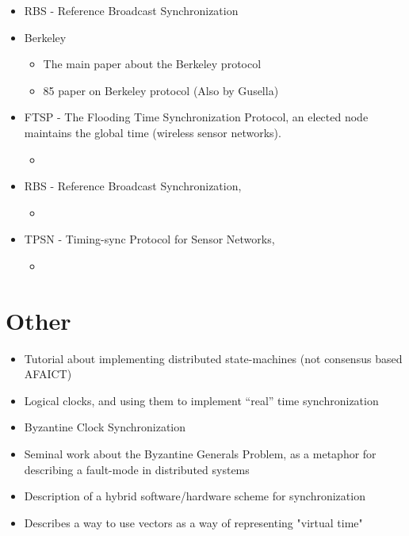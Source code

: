 \documentclass[a4paper,12pt]{article}
\begin{document}
\begin{itemize}
\item \cite{ElsonGirodEstrin02} RBS - Reference Broadcast Synchronization
\item Berkeley
  \begin{itemize}
  \item \cite{Gusella89} The main paper about the Berkeley protocol
  \item \cite{GusellaZatti85} 85 paper on Berkeley protocol (Also by Gusella)
  \end{itemize}
\item FTSP - The Flooding Time Synchronization Protocol, an elected node maintains the global time (wireless sensor networks).
    \begin{itemize}
        \item \cite{Maroti04} 
    \end{itemize}
\item RBS - Reference Broadcast Synchronization, 
    \begin{itemize}
        \item \cite{Elson02}
    \end{itemize}
\item TPSN - Timing-sync Protocol for Sensor Networks,
    \begin{itemize}
        \item 
    \end{itemize}
\end{itemize}



\section{Other}

\begin{itemize}
\item \cite{Schneider90} Tutorial about implementing distributed state-machines (not consensus based AFAICT)
\item \cite{Lamport78} Logical clocks, and using them to implement ``real'' time synchronization
\item \cite{LamportEtAl84} Byzantine Clock Synchronization
\item \cite{Lamport82} Seminal work about the Byzantine Generals Problem, as a metaphor for describing a fault-mode in distributed systems
\item \cite{Ramanathan90} Description of a hybrid software/hardware scheme for synchronization
\item \cite{Mattern89} Describes a way to use vectors as a way of representing "virtual time"
\end{itemize}

\printbibliography
\end{document}
